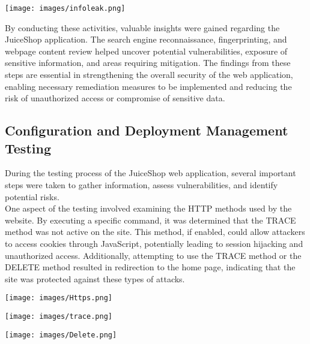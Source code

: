\documentclass[12pt]{article}
\begin{document}
\begin{center}
    \texttt{[image: images/infoleak.png]}
\end{center}

By conducting these activities, valuable insights were gained regarding the JuiceShop application. The search engine reconnaissance, fingerprinting, and webpage content review helped uncover potential vulnerabilities, exposure of sensitive information, and areas requiring mitigation. The findings from these steps are essential in strengthening the overall security of the web application, enabling necessary remediation measures to be implemented and reducing the risk of unauthorized access or compromise of sensitive data.\\

\newpage

\subsection{Configuration and Deployment Management Testing}
During the testing process of the JuiceShop web application, several important steps were taken to gather information, assess vulnerabilities, and identify potential risks.\\

One aspect of the testing involved examining the HTTP methods used by the website. By executing a specific command, it was determined that the TRACE method was not active on the site. This method, if enabled, could allow attackers to access cookies through JavaScript, potentially leading to session hijacking and unauthorized access. Additionally, attempting to use the TRACE method or the DELETE method resulted in redirection to the home page, indicating that the site was protected against these types of attacks.\\

\begin{center}
    \texttt{[image: images/Https.png]}
\end{center}

\begin{center}
    \texttt{[image: images/trace.png]}
\end{center}

\begin{center}
    \texttt{[image: images/Delete.png]}
\end{center}
\end{document}
